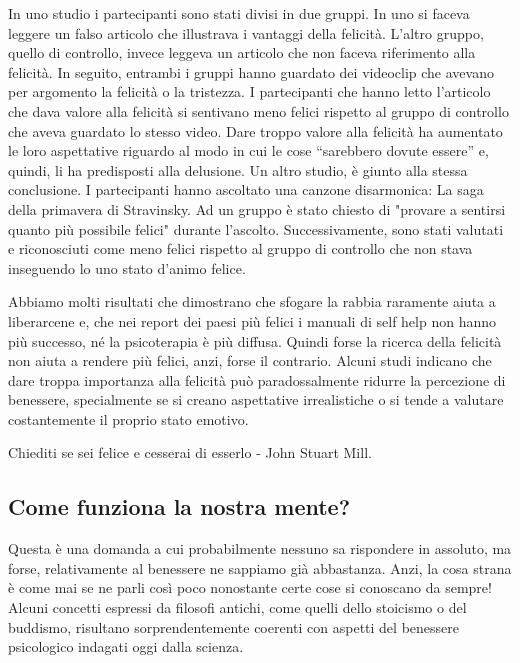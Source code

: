 \documentclass[12pt]{book} %
\begin{document}
In uno studio i partecipanti sono stati divisi in
due gruppi. In uno si faceva leggere un falso articolo che illustrava i vantaggi della felicità.
L'altro gruppo, quello di controllo, invece leggeva un articolo che non faceva riferimento alla
felicità. In seguito, entrambi i gruppi hanno guardato dei videoclip che avevano per argomento la felicità o la
tristezza. I partecipanti che hanno letto l'articolo che dava valore alla felicità si sentivano
meno felici rispetto al gruppo di controllo che aveva guardato lo stesso video. Dare troppo valore alla felicità ha
aumentato le loro aspettative riguardo al modo in cui le cose “sarebbero dovute essere” e, quindi, li ha predisposti
alla delusione. Un altro
studio, è giunto alla stessa conclusione. I partecipanti hanno ascoltato una canzone disarmonica: La saga della primavera di
Stravinsky. Ad un gruppo è stato chiesto di "provare a sentirsi quanto più possibile
felici" durante l'ascolto. Successivamente, sono stati valutati e
riconosciuti come meno felici rispetto al gruppo di controllo che non stava inseguendo lo uno stato
d'animo felice. 

Abbiamo molti risultati che dimostrano che sfogare la rabbia raramente aiuta a liberarcene e, che nei report dei paesi più felici i manuali di self help non hanno più successo,
né la psicoterapia è più diffusa. Quindi forse la ricerca della felicità non aiuta a rendere più felici, anzi, forse il
contrario. Alcuni studi indicano che dare troppa importanza alla felicità può paradossalmente ridurre la percezione di benessere, specialmente se si creano aspettative irrealistiche o si tende a valutare costantemente il proprio stato emotivo. 

Chiediti se sei felice e cesserai di esserlo - John Stuart Mill.

\subsection{Come funziona la nostra mente?}
Questa è una domanda a cui probabilmente nessuno sa rispondere in assoluto, ma forse, relativamente al benessere ne sappiamo già
abbastanza. Anzi, la cosa strana è come mai se ne parli così poco nonostante certe cose si conoscano da sempre! Alcuni concetti espressi da filosofi antichi, come quelli dello stoicismo o del buddismo, risultano sorprendentemente coerenti con aspetti del benessere psicologico indagati oggi dalla scienza.
\end{document}
